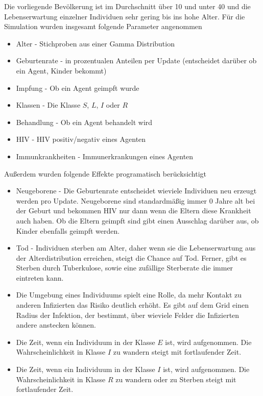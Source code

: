 \documentclass[paper=a4, fontsize=11pt, ngerman, abstract=on]{scrartcl}
\numberwithin{equation}{section} %
\numberwithin{figure}{section} %
\numberwithin{table}{section} %
\begin{document}
Die vorliegende Bevölkerung ist im Durchschnitt über 10 und unter 40 und die Lebenserwartung einzelner Individuen sehr gering bis ins hohe Alter. Für die Simulation wurden insgesamt folgende Parameter angenommen

\begin{itemize}
  \item{Alter - Stichproben aus einer Gamma Distribution}
  \item{Geburtenrate - in prozentualen Anteilen per Update (entscheidet darüber ob ein Agent, Kinder bekommt)}
  \item{Impfung - Ob ein Agent geimpft wurde}
  \item{Klassen - Die Klasse $S$, $L$, $I$ oder $R$}
  \item{Behandlung - Ob ein Agent behandelt wird}
  \item{HIV - HIV positiv/negativ eines Agenten}
  \item{Immunkrankheiten - Immunerkrankungen eines Agenten}
\end{itemize}

Außerdem wurden folgende Effekte programatisch berücksichtigt

\begin{itemize}
  \item{Neugeborene - Die Geburtenrate entscheidet wieviele Individuen neu erzeugt werden pro Update. Neugeborene sind standardmäßig immer 0 Jahre alt bei der Geburt und bekommen HIV nur dann wenn die Eltern diese Krankheit auch haben. Ob die Eltern geimpft sind gibt einen Ausschlag darüber aus, ob Kinder ebenfalls geimpft werden.}
  \item{Tod - Individuen sterben am Alter, daher wenn sie die Lebenserwartung aus der Alterdistribution erreichen, steigt die Chance auf Tod. Ferner, gibt es Sterben durch Tuberkulose, sowie eine zufällige Sterberate die immer eintreten kann.}
  \item{Die Umgebung eines Individuums spielt eine Rolle, da mehr Kontakt zu anderen Infizierten das Risiko deutlich erhöht. Es gibt auf dem Grid einen Radius der Infektion, der bestimmt, über wieviele Felder die Infizierten andere anstecken können.}
  \item{Die Zeit, wenn ein Individuum in der Klasse $E$ ist, wird aufgenommen. Die Wahrscheinlichkeit in Klasse $I$ zu wandern steigt mit fortlaufender Zeit.}
  \item{Die Zeit, wenn ein Individuum in der Klasse $I$ ist, wird aufgenommen. Die Wahrscheinlichkeit in Klasse $R$ zu wandern oder zu Sterben steigt mit fortlaufender Zeit.}
\end{itemize}
\end{document}
